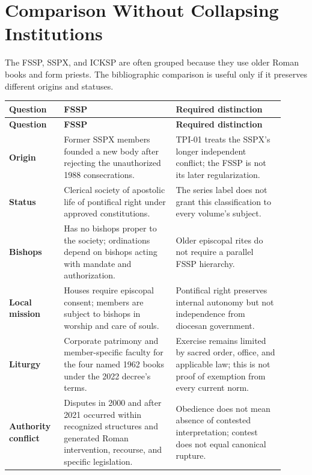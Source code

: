 \section{Comparison Without Collapsing Institutions}

The FSSP, SSPX, and ICKSP are often grouped because they use older Roman books and form priests. The bibliographic comparison is useful only if it preserves different origins and statuses.

\begin{longtable}{>{\bfseries\RaggedRight\arraybackslash}p{0.18\linewidth}>{\RaggedRight\arraybackslash}p{0.37\linewidth}>{\RaggedRight\arraybackslash}p{0.36\linewidth}}
\toprule
\textbf{Question} & \textbf{FSSP} & \textbf{Required distinction}\\
\midrule
\endfirsthead
\toprule
\textbf{Question} & \textbf{FSSP} & \textbf{Required distinction}\\
\midrule
\endhead
\bottomrule
\endfoot
Origin & Former SSPX members founded a new body after rejecting the unauthorized 1988 consecrations. & TPI-01 treats the SSPX's longer independent conflict; the FSSP is not its later regularization.\\
Status & Clerical society of apostolic life of pontifical right under approved constitutions. & The series label does not grant this classification to every volume's subject.\\
Bishops & Has no bishops proper to the society; ordinations depend on bishops acting with mandate and authorization. & Older episcopal rites do not require a parallel FSSP hierarchy.\\
Local mission & Houses require episcopal consent; members are subject to bishops in worship and care of souls. & Pontifical right preserves internal autonomy but not independence from diocesan government.\\
Liturgy & Corporate patrimony and member-specific faculty for the four named 1962 books under the 2022 decree's terms. & Exercise remains limited by sacred order, office, and applicable law; this is not proof of exemption from every current norm.\\
Authority conflict & Disputes in 2000 and after 2021 occurred within recognized structures and generated Roman intervention, recourse, and specific legislation. & Obedience does not mean absence of contested interpretation; contest does not equal canonical rupture.\\
\end{longtable}

